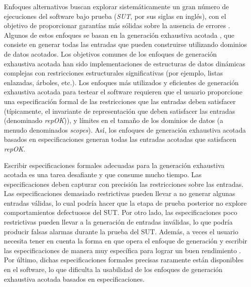 Enfoques alternativos buscan explorar sistemáticamente un gran número de ejecuciones del software bajo prueba (\emph{SUT}, por sus siglas en inglés), con el objetivo de proporcionar garantías más sólidas sobre la ausencia de errores \cite{Marinov01, Boyapati02, Godefroid05, Godefroid18, Cadar08, Luckow14}. Algunos de estos enfoques se basan en la generación exhaustiva acotada \cite{Marinov01, Boyapati02}, que consiste en generar todas las entradas que pueden construirse utilizando dominios de datos acotados. Los objetivos comunes de los enfoques de generación exhaustiva acotada han sido implementaciones de estructuras de datos dinámicas complejas con restricciones estructurales significativas (por ejemplo, listas enlazadas, árboles, etc.). Los enfoques más utilizados y eficientes de generación exhaustiva acotada para testear el software \cite{Marinov01, Boyapati02} requieren que el usuario proporcione una especificación formal de las restricciones que las entradas deben satisfacer (típicamente, el invariante de representación que deben satisfacer las entradas (denominado \textit{repOK})), y límites en el tamaño de los dominios de datos \cite{Marinov01, Boyapati02} (a menudo denominados \textit{scopes}). Así, los enfoques de generación exhaustiva acotada basados en especificaciones generan todas las entradas acotadas que satisfacen \textit{repOK}.

Escribir especificaciones formales adecuadas para la generación exhaustiva acotada es una tarea desafiante y que consume mucho tiempo. Las especificaciones deben capturar con precisión las restricciones sobre las  entradas. Las especificaciones demasiado restrictivas pueden llevar a no generar algunas entradas válidas, lo cual podría hacer que la etapa de prueba posterior no explore comportamientos defectuosos del SUT. Por otro lado, las especificaciones poco restrictivas pueden llevar a la generación de entradas inválidas, lo que podría producir falsas alarmas durante la prueba del SUT. Además, a veces el usuario necesita tener en cuenta la forma en que opera el enfoque de generación y escribir las especificaciones de manera muy específica para lograr un buen rendimiento \cite{Boyapati02}. Por último, dichas especificaciones formales precisas raramente están disponibles en el software, lo que dificulta la usabilidad de los enfoques de generación exhaustiva acotada basados en especificaciones.

